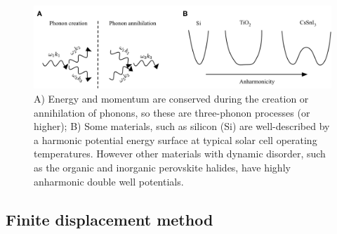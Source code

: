 


\begin{figure}[h]
\centering
  \includegraphics[width=1.0\columnwidth]{figures/ch3/anharmonicity.png}
  \caption[3-phonon processes and anharmonic potential energy surfaces]{A) Energy and momentum are conserved during the creation or annihilation of phonons, so these are three-phonon processes (or higher); B) Some materials, such as silicon (Si) are well-described by a harmonic potential energy surface at typical solar cell operating temperatures. However other materials with dynamic disorder, such as the organic and inorganic perovskite halides, have highly anharmonic double well potentials.}
  \label{harmonicregime}
\end{figure}  %



\subsection{Finite displacement method} \label{finitedisplacement}

